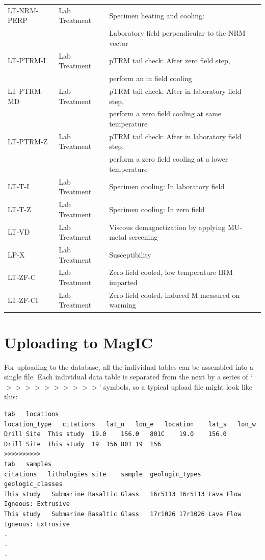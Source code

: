 \documentclass[11pt]{book}
\begin{document}
{{\begin{tabular}{lll}
LT-NRM-PERP \qquad & Lab Treatment \qquad & Specimen heating and cooling: \\
\qquad &\qquad &Laboratory field perpendicular to the NRM vector\\
LT-PTRM-I \qquad & Lab Treatment \qquad & pTRM tail check: After zero field step, \\
\qquad &\qquad &perform an in field cooling\\
LT-PTRM-MD \qquad & Lab Treatment \qquad & pTRM tail check: After in laboratory field step, \\
\qquad &\qquad &perform a zero field cooling at same temperature\\
LT-PTRM-Z \qquad & Lab Treatment \qquad & pTRM tail check: After in laboratory field step,\\
\qquad &\qquad & perform a zero field cooling at a lower temperature\\
LT-T-I \qquad & Lab Treatment \qquad & Specimen cooling: In laboratory field\\
LT-T-Z \qquad & Lab Treatment \qquad & Specimen cooling: In zero field\\
LT-VD \qquad & Lab Treatment \qquad & Viscous demagnetization by applying MU-metal screening\\
LP-X \qquad & Lab Treatment \qquad & Susceptibility\\
LT-ZF-C \qquad & Lab Treatment \qquad & Zero field cooled, low temperature IRM imparted\\
LT-ZF-CI \qquad & Lab Treatment \qquad & Zero field cooled, induced M measured on warming\\
\hline
\end{tabular}

\section{Uploading to MagIC}

For uploading to the database, all the individual tables can be assembled into a single file.  Each individual data table is separated from the next by a series of `$>>>>>>>>>>$' symbols, so a typical upload file might look like this:


\begin{verbatim}
tab   locations
location_type	citations	lat_n	lon_e	location	lat_s	lon_w
Drill Site	This study	19.0	156.0	801C	19.0	156.0
Drill Site	This study	19	156	801	19	156
>>>>>>>>>>
tab   samples
citations	lithologies	site	sample	geologic_types	geologic_classes
This study   Submarine Basaltic Glass	16r5113	16r5113	Lava Flow	Igneous: Extrusive
This study   Submarine Basaltic Glass	17r1026	17r1026	Lava Flow	Igneous: Extrusive
.
.
.
\end{verbatim}

}}
\end{document}
